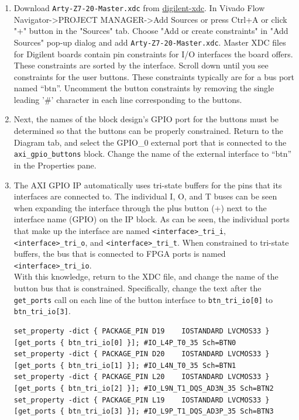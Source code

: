 \documentclass[a4paper,12pt,twoside]{article}
\begin{document}
\begin{enumerate}
    \item Download \texttt{Arty-Z7-20-Master.xdc} from \href{https://github.com/Digilent/digilent-xdc}{digilent-xdc}. In Vivado Flow Navigator->PROJECT MANAGER->Add Sources or press Ctrl+A or click "+" button in the "Sources" tab. Choose "Add or create constraints" in "Add Sources" pop-up dialog and add \texttt{Arty-Z7-20-Master.xdc}. Master XDC files for Digilent boards contain pin constraints for I/O interfaces the board offers. These constraints are sorted by the interface. Scroll down until you see constraints for the user buttons. These constraints typically are for a bus port named “btn”. Uncomment the button constraints by removing the single leading '\#' character in each line corresponding to the buttons.
    \item Next, the names of the block design's GPIO port for the buttons must be determined so that the buttons can be properly constrained. Return to the Diagram tab, and select the GPIO\_0 external port that is connected to the \texttt{axi\_gpio\_buttons} block. Change the name of the external interface to “btn” in the Properties pane.
    \item The AXI GPIO IP automatically uses tri-state buffers for the pins that its interfaces are connected to. The individual I, O, and T buses can be seen when expanding the interface through the plus button (+) next to the interface name (GPIO) on the IP block. As can be seen, the individual ports that make up the interface are named \texttt{<interface>\_tri\_i}, \texttt{<interface>\_tri\_o}, and \texttt{<interface>\_tri\_t}. When constrained to tri-state buffers, the bus that is connected to FPGA ports is named \texttt{<interface>\_tri\_io}.\\
    With this knowledge, return to the XDC file, and change the name of the button bus that is constrained. Specifically, change the text after the \texttt{get\_ports} call on each line of the button interface to \texttt{btn\_tri\_io[0]} to \texttt{btn\_tri\_io[3]}.
    \begin{verbatim}
set_property -dict { PACKAGE_PIN D19    IOSTANDARD LVCMOS33 } [get_ports { btn_tri_io[0] }]; #IO_L4P_T0_35 Sch=BTN0
set_property -dict { PACKAGE_PIN D20    IOSTANDARD LVCMOS33 } [get_ports { btn_tri_io[1] }]; #IO_L4N_T0_35 Sch=BTN1
set_property -dict { PACKAGE_PIN L20    IOSTANDARD LVCMOS33 } [get_ports { btn_tri_io[2] }]; #IO_L9N_T1_DQS_AD3N_35 Sch=BTN2
set_property -dict { PACKAGE_PIN L19    IOSTANDARD LVCMOS33 } [get_ports { btn_tri_io[3] }]; #IO_L9P_T1_DQS_AD3P_35 Sch=BTN3

\end{verbatim}
\end{enumerate}
\end{document}
